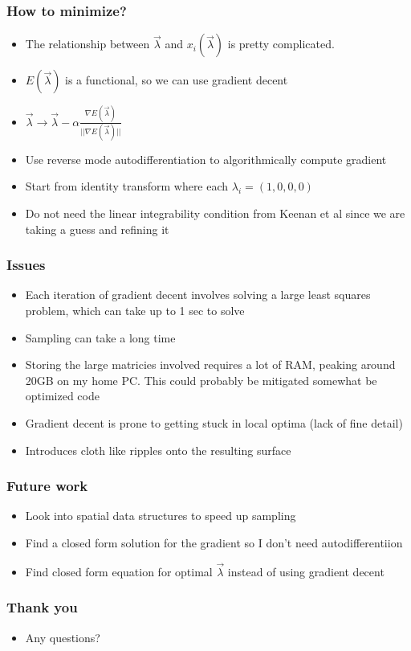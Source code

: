 \documentclass{beamer}
\begin{document}
\begin{frame}
\frametitle{How to minimize?}
\begin{itemize}
\item The relationship between $\vec{\lambda}$ and $x_{i}(\vec{\lambda})$ is pretty complicated. 
\item $E(\vec{\lambda})$ is a functional, so we can use gradient decent
\item $\vec{\lambda} \rightarrow \vec{\lambda} - \alpha\frac{\nabla E(\vec{\lambda})}{||\nabla E(\vec{\lambda})||}$
\item Use reverse mode autodifferentiation to algorithmically compute gradient
\item Start from identity transform where each $\lambda_{i} = (1,0,0,0)$
\item Do not need the linear integrability condition from Keenan et al since we are taking a guess and refining it
\end{itemize}
\end{frame}

\begin{frame}
\frametitle{Issues}
\begin{itemize}
\item Each iteration of gradient decent involves solving a large least squares problem, which can take up to 1 sec to solve
\item Sampling can take a long time
\item Storing the large matricies involved requires a lot of RAM, peaking around 20GB on my home PC. This could probably be mitigated somewhat be optimized code
\item Gradient decent is prone to getting stuck in local optima (lack of fine detail)
\item Introduces cloth like ripples onto the resulting surface
\end{itemize}
\end{frame}

\begin{frame}
\frametitle{Future work}
\begin{itemize}
\item Look into spatial data structures to speed up sampling
\item Find a closed form solution for the gradient so I don't need autodifferentiion
\item Find closed form equation for optimal $\vec{\lambda}$ instead of using gradient decent
\end{itemize}
\end{frame}

\begin{frame}
\frametitle{Thank you}
\begin{itemize}
 \item Any questions?
\end{itemize}
\end{frame}
\end{document}
